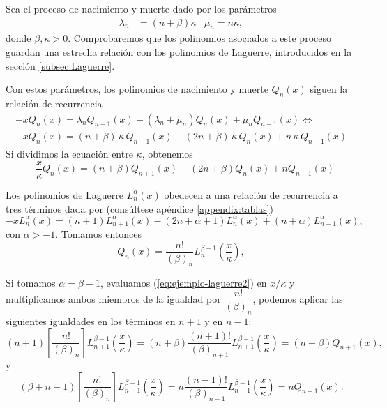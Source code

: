 \begin{ejemplo}
    Sea el proceso de nacimiento y muerte dado por los parámetros
    \begin{align*}
        \lambda_n &=(n+\beta)\kappa & \mu_n = n\kappa, 
    \end{align*}
    donde $\beta,\kappa > 0$. Comprobaremos que los polinomios asociados a este proceso guardan una estrecha relación con los polinomios de Laguerre, introducidos en la sección \ref{subsec:Laguerre}.

    Con estos parámetros, los polinomios de nacimiento y muerte $Q_n(x)$ siguen la relación de recurrencia
    \begin{equation*}
        \begin{array}{c}
            -xQ_n(x) = \lambda_n Q_{n+1}(x) - (\lambda_n+\mu_n)Q_n(x) +\mu_n Q_{n-1}(x) \Leftrightarrow \\
            -x Q_n(x) = (n+\beta)\,\kappa\, Q_{n+1}(x) -(2n+\beta)\,\kappa\, Q_n(x) + n\,\kappa\, Q_{n-1}(x)
        \end{array}
    \end{equation*}
    Si dividimos la ecuación entre $\kappa$, obtenemos
    \begin{equation}
        \label{eq:ejemplo-laguerre1}
        -\frac{x}{\kappa} Q_n(x) = (n+\beta)Q_{n+1}(x) -(2n+\beta)Q_n(x) + n Q_{n-1}(x)
    \end{equation}
    

    Los polinomios de Laguerre $L_n^\alpha(x)$ obedecen a una relación de recurrencia a tres términos dada por (consúltese apéndice \ref{appendix:tablas})
    \begin{equation}
        \label{eq:ejemplo-laguerre2}
        -x L_n^\alpha(x) = (n+1) L_{n+1}^\alpha(x) - (2n+\alpha+1)L_n^\alpha(x) + (n+\alpha)L_{n-1}^\alpha(x),
    \end{equation}
    con $\alpha > -1$. Tomamos entonces 
    \begin{equation}
        \label{eq:polinomiosQejemplo}
        Q_n(x) = \dfrac{n!}{(\beta)_n} L_n^{\beta-1}\left(\frac x \kappa\right),    
    \end{equation}
    
    Si tomamos $\alpha = \beta-1$, evaluamos (\ref{eq:ejemplo-laguerre2}) en $x/\kappa$ y multiplicamos ambos miembros de la igualdad por $\dfrac{n!}{(\beta)_n}$, podemos aplicar las siguientes igualdades en los términos en $n+1$ y en $n-1$:
    $$
    (n+1)\left[\dfrac{n!}{(\beta)_n}\right]L_{n+1}^{\beta-1} \left(\frac x \kappa\right) = (n+\beta)\dfrac{(n+1)!}{(\beta)_{n+1}} L_{n+1}^{\beta-1} \left(\frac x \kappa\right) = (n+\beta)Q_{n+1}(x),
    $$
    y
    $$
    (\beta+n-1)\left[\dfrac{n!}{(\beta)_n}\right]L_{n-1}^{\beta-1} \left(\frac x \kappa\right) = n\dfrac{(n-1)!}{(\beta)_{n-1}} L_{n-1}^{\beta-1} \left(\frac x \kappa\right) =n Q_{n-1}(x).
    $$
    

\end{ejemplo}
